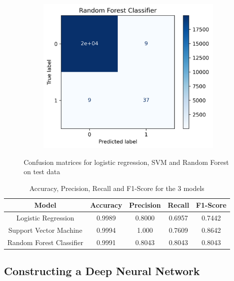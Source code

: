 \documentclass[utf8x]{ctexart}
\begin{document}
\begin{figure}[htb]
\begin{subfigure}[b]{0.32\textwidth}
  \end{subfigure}
  \begin{subfigure}[b]{0.32\textwidth}
    \centering
    \includegraphics[width=\textwidth]{./images/rfc_conf1.png}
    \label{fig:scalelocationplotprice}
  \end{subfigure}
  \caption{Confusion matrices for logistic regression, SVM and Random Forest on test data}
  \label{fig:confusion1}
\end{figure}

\begin{table}[ht]
  \centering
  \caption{Accuracy, Precision, Recall and F1-Score for the 3 models}
  \label{tab:metrics1}
  \begin{tabular}{c|cccc}
    Model                    & Accuracy & Precision & Recall & F1-Score \\
    \hline
    Logistic Regression      & 0.9989   & 0.8000    & 0.6957 & 0.7442   \\
    Support Vector Machine   & 0.9994   & 1.000     & 0.7609 & 0.8642   \\
    Random Forest Classifier & 0.9991   & 0.8043    & 0.8043 & 0.8043   \\
  \end{tabular}
\end{table}

\subsection{Constructing a Deep Neural Network}
\end{document}
